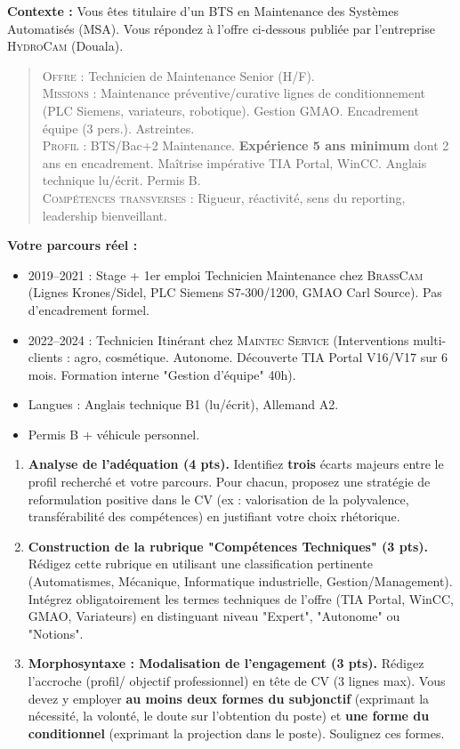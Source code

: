 \documentclass[11pt]{article}
\begin{document}
\begin{exercice}
\textbf{Contexte :} Vous êtes titulaire d'un BTS en Maintenance des Systèmes Automatisés (MSA). Vous répondez à l'offre ci-dessous publiée par l'entreprise \textsc{HydroCam} (Douala).

\begin{quote}
\textsc{Offre :} Technicien de Maintenance Senior (H/F).\\
\textsc{Missions :} Maintenance préventive/curative lignes de conditionnement (PLC Siemens, variateurs, robotique). Gestion GMAO. Encadrement équipe (3 pers.). Astreintes.\\
\textsc{Profil :} BTS/Bac+2 Maintenance. \textbf{Expérience 5 ans minimum} dont 2 ans en encadrement. Maîtrise impérative TIA Portal, WinCC. Anglais technique lu/écrit. Permis B.\\
\textsc{Compétences transverses :} Rigueur, réactivité, sens du reporting, leadership bienveillant.
\end{quote}

\textbf{Votre parcours réel :}
\begin{itemize}
    \item 2019--2021 : Stage + 1er emploi Technicien Maintenance chez \textsc{BrassCam} (Lignes Krones/Sidel, PLC Siemens S7-300/1200, GMAO Carl Source). Pas d'encadrement formel.
    \item 2022--2024 : Technicien Itinérant chez \textsc{Maintec Service} (Interventions multi-clients : agro, cosmétique. Autonome. Découverte TIA Portal V16/V17 sur 6 mois. Formation interne "Gestion d'équipe" 40h).
    \item Langues : Anglais technique B1 (lu/écrit), Allemand A2.
    \item Permis B + véhicule personnel.
\end{itemize}

\begin{enumerate}
    \item \textbf{Analyse de l'adéquation (4 pts).} Identifiez \textbf{trois} écarts majeurs entre le profil recherché et votre parcours. Pour chacun, proposez une stratégie de reformulation positive dans le CV (ex : valorisation de la polyvalence, transférabilité des compétences) en justifiant votre choix rhétorique.
    \item \textbf{Construction de la rubrique "Compétences Techniques" (3 pts).} Rédigez cette rubrique en utilisant une classification pertinente (Automatismes, Mécanique, Informatique industrielle, Gestion/Management). Intégrez obligatoirement les termes techniques de l'offre (TIA Portal, WinCC, GMAO, Variateurs) en distinguant niveau "Expert", "Autonome" ou "Notions".
    \item \textbf{Morphosyntaxe : Modalisation de l'engagement (3 pts).} Rédigez l'accroche (profil/ objectif professionnel) en tête de CV (3 lignes max). Vous devez y employer \textbf{au moins deux formes du subjonctif} (exprimant la nécessité, la volonté, le doute sur l'obtention du poste) et \textbf{une forme du conditionnel} (exprimant la projection dans le poste). Soulignez ces formes.
\end{enumerate}
\end{exercice}
\end{document}
